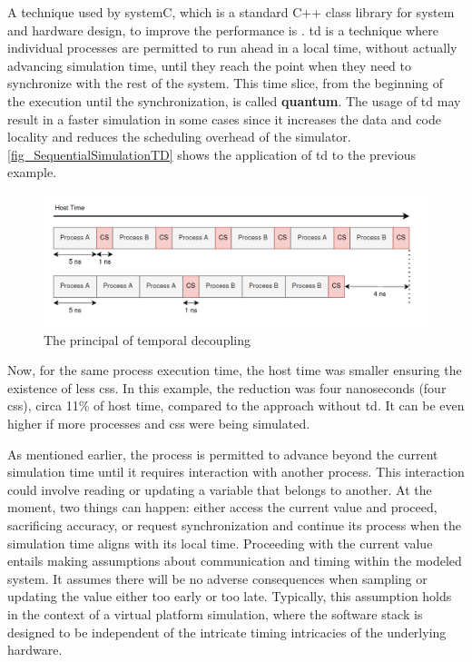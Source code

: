 A technique used by systemC, which is a standard C++ class
library for system and hardware design, to improve the performance is  \cite{systemC}. \gls{td} is a technique where individual processes are permitted to run ahead in a local time, without actually advancing simulation time, until they reach the point when they need to synchronize with the rest of the system. This time slice, from the beginning of the execution until the synchronization, is called \textbf{quantum}. The usage of \gls{td} may result in a faster simulation in some cases since it increases the data and code locality and reduces the scheduling overhead of the simulator. \autoref{fig_SequentialSimulationTD} shows the application of \gls{td} to the previous example. 

\begin{figure}[H]
	\centering
 	\includegraphics[width=0.8\linewidth]{Images/SequentialSimulationTD.png}
 	\caption{The principal of temporal decoupling}
	 \label{fig_SequentialSimulationTD}
\end{figure}

Now, for the same process execution time, the host time was smaller ensuring the existence of less \glspl{cs}. In this example, the reduction was four nanoseconds (four \glspl{cs}), circa 11\% of host time, compared to the approach without \gls{td}. It can be even higher if more processes and \glspl{cs} were being simulated.


As mentioned earlier, the process is permitted to advance beyond the current simulation time until it requires interaction with another process. This interaction could involve reading or updating a variable that belongs to another. At the moment, two things can happen: either access the current value and proceed, sacrificing accuracy, or request synchronization and continue its process when the simulation time aligns with its local time. Proceeding with the current value entails making assumptions about communication and timing within the modeled system. It assumes there will be no adverse consequences when sampling or updating the value either too early or too late. Typically, this assumption holds in the context of a virtual platform simulation, where the software stack is designed to be independent of the intricate timing intricacies of the underlying hardware.

